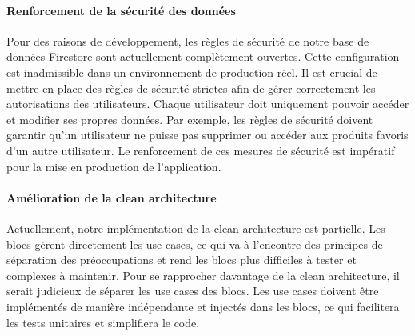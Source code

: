 \paragraph{Renforcement de la sécurité des données}
Pour des raisons de développement, les règles de sécurité de notre base de données Firestore sont actuellement complètement ouvertes. Cette configuration est inadmissible dans un environnement de production réel. Il est crucial de mettre en place des règles de sécurité strictes afin de gérer correctement les autorisations des utilisateurs. Chaque utilisateur doit uniquement pouvoir accéder et modifier ses propres données. Par exemple, les règles de sécurité doivent garantir qu'un utilisateur ne puisse pas supprimer ou accéder aux produits favoris d'un autre utilisateur. Le renforcement de ces mesures de sécurité est impératif pour la mise en production de l'application.

\paragraph{Amélioration de la clean architecture}
Actuellement, notre implémentation de la clean architecture est partielle. Les blocs gèrent directement les use cases, ce qui va à l'encontre des principes de séparation des préoccupations et rend les blocs plus difficiles à tester et complexes à maintenir. Pour se rapprocher davantage de la clean architecture, il serait judicieux de séparer les use cases des blocs. Les use cases doivent être implémentés de manière indépendante et injectés dans les blocs, ce qui facilitera les tests unitaires et simplifiera le code.

